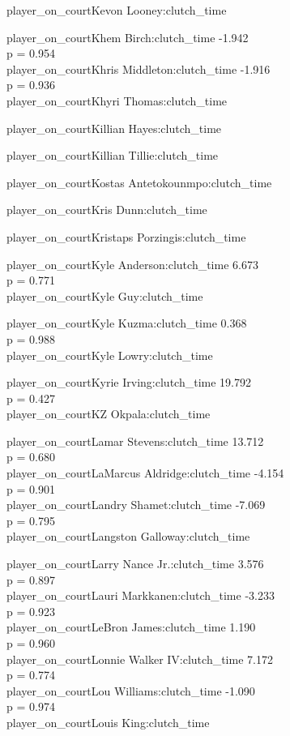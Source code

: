 \documentclass[
  landscape]{article}
\begin{document}
player\_on\_courtKevon Looney:clutch\_time

player\_on\_courtKhem Birch:clutch\_time -1.942\\
p = 0.954\\
player\_on\_courtKhris Middleton:clutch\_time -1.916\\
p = 0.936\\
player\_on\_courtKhyri Thomas:clutch\_time

player\_on\_courtKillian Hayes:clutch\_time

player\_on\_courtKillian Tillie:clutch\_time

player\_on\_courtKostas Antetokounmpo:clutch\_time

player\_on\_courtKris Dunn:clutch\_time

player\_on\_courtKristaps Porzingis:clutch\_time

player\_on\_courtKyle Anderson:clutch\_time 6.673\\
p = 0.771\\
player\_on\_courtKyle Guy:clutch\_time

player\_on\_courtKyle Kuzma:clutch\_time 0.368\\
p = 0.988\\
player\_on\_courtKyle Lowry:clutch\_time

player\_on\_courtKyrie Irving:clutch\_time 19.792\\
p = 0.427\\
player\_on\_courtKZ Okpala:clutch\_time

player\_on\_courtLamar Stevens:clutch\_time 13.712\\
p = 0.680\\
player\_on\_courtLaMarcus Aldridge:clutch\_time -4.154\\
p = 0.901\\
player\_on\_courtLandry Shamet:clutch\_time -7.069\\
p = 0.795\\
player\_on\_courtLangston Galloway:clutch\_time

player\_on\_courtLarry Nance Jr.:clutch\_time 3.576\\
p = 0.897\\
player\_on\_courtLauri Markkanen:clutch\_time -3.233\\
p = 0.923\\
player\_on\_courtLeBron James:clutch\_time 1.190\\
p = 0.960\\
player\_on\_courtLonnie Walker IV:clutch\_time 7.172\\
p = 0.774\\
player\_on\_courtLou Williams:clutch\_time -1.090\\
p = 0.974\\
player\_on\_courtLouis King:clutch\_time
\end{document}
